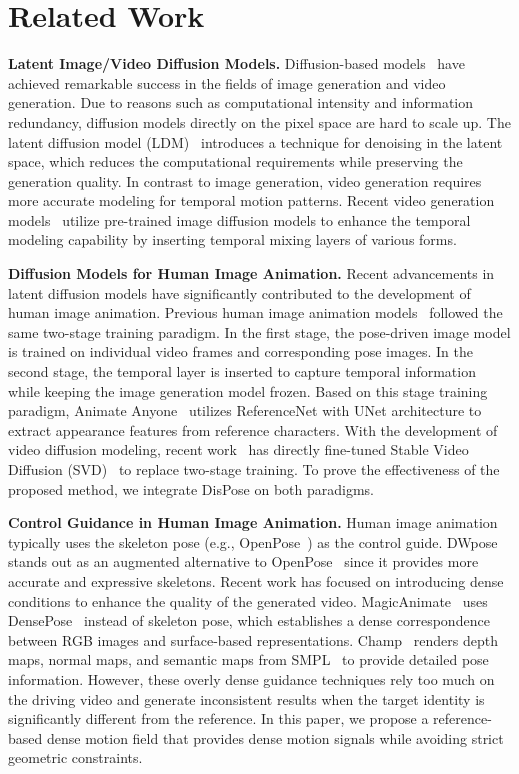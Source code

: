 \section{Related Work}
\textbf{Latent Image/Video Diffusion Models.} 
Diffusion-based models~\citep{ho2020denoising,song2020score,rombach2022high,zhang2023adding} have achieved remarkable success in the fields of image generation and video generation. 
Due to reasons such as computational intensity and information redundancy, diffusion models directly on the pixel space are hard to scale up. The latent diffusion model (LDM)~\citep{rombach2022high} introduces a technique for denoising in the latent space, which reduces the computational requirements while preserving the generation quality. In contrast to image generation, video generation requires more accurate modeling for temporal motion patterns. Recent video generation models~\citep{blattmann2023align,ge2023preserve,guo2023animatediff} utilize pre-trained image diffusion models to enhance the temporal modeling capability by inserting temporal mixing layers of various forms.


\textbf{Diffusion Models for Human Image Animation.}
Recent advancements in latent diffusion models have significantly contributed to the development of human image animation. Previous human image animation models~\citep{wang2024disco,xu2024magicanimate,chang2023magicpose} followed the same two-stage training paradigm. In the first stage, the pose-driven image model is trained on individual video frames and corresponding pose images. In the second stage, the temporal layer is inserted to capture temporal information while keeping the image generation model frozen. Based on this stage training paradigm, Animate Anyone~\citep{hu2023animate} utilizes ReferenceNet with UNet architecture to extract appearance features from reference characters. With the development of video diffusion modeling, recent work~\citep{zhang2024mimicmotion} has directly fine-tuned Stable Video Diffusion (SVD)~\citep{blattmann2023svd} to replace two-stage training. To prove the effectiveness of the proposed method, we integrate DisPose on both paradigms.

\textbf{Control Guidance in Human Image Animation.}
Human image animation typically uses the skeleton pose (e.g., OpenPose~\citep{cao2017openpose}) as the control guide. DWpose~\citep{yang2023dwpose} stands out as an augmented alternative to OpenPose~\citep{cao2017openpose} since it provides more accurate and expressive skeletons. Recent work has focused on introducing dense conditions to enhance the quality of the generated video. MagicAnimate~\citep{xu2024magicanimate} uses DensePose~\citep{guler2018densepose} instead of skeleton pose, which establishes a dense correspondence between RGB images and surface-based representations. Champ~\citep{zhu2024champ} renders depth maps, normal maps, and semantic maps from SMPL~\citep{SMPL:2015} to provide detailed pose information. However, these overly dense guidance techniques rely too much on the driving video and generate inconsistent results when the target identity is significantly different from the reference. In this paper, we propose a reference-based dense motion field that provides dense motion signals while avoiding strict geometric constraints.